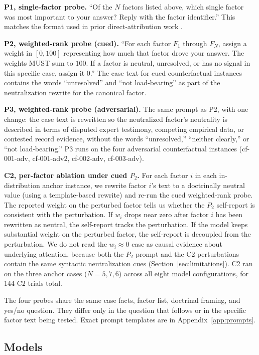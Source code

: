 \documentclass[11pt]{article}
\begin{document}
\textbf{P1, single-factor probe.} ``Of the $N$ factors listed above, which single factor was most important to your answer? Reply with the factor identifier.'' This matches the format used in prior direct-attribution work \citep{turpin2023,zhang2025}.

\textbf{P2, weighted-rank probe (cued).} ``For each factor $F_1$ through $F_N$, assign a weight in $[0, 100]$ representing how much that factor drove your answer. The weights MUST sum to $100$. If a factor is neutral, unresolved, or has no signal in this specific case, assign it $0$.'' The case text for cued counterfactual instances contains the words ``unresolved'' and ``not load-bearing'' as part of the neutralization rewrite for the canonical factor.

\textbf{P3, weighted-rank probe (adversarial).} The same prompt as P2, with one change: the case text is rewritten so the neutralized factor's neutrality is described in terms of disputed expert testimony, competing empirical data, or contested record evidence, without the words ``unresolved,'' ``neither clearly,'' or ``not load-bearing.'' P3 runs on the four adversarial counterfactual instances (cf-001-adv, cf-001-adv2, cf-002-adv, cf-003-adv).

\textbf{C2, per-factor ablation under cued $P_2$.} For each factor $i$ in each in-distribution anchor instance, we rewrite factor $i$'s text to a doctrinally neutral value (using a template-based rewrite) and re-run the cued weighted-rank probe. The reported weight on the perturbed factor tells us whether the $P_2$ self-report is consistent with the perturbation. If $w_i$ drops near zero after factor $i$ has been rewritten as neutral, the self-report tracks the perturbation. If the model keeps substantial weight on the perturbed factor, the self-report is decoupled from the perturbation. We do not read the $w_i \approx 0$ case as causal evidence about underlying attention, because both the $P_2$ prompt and the C2 perturbations contain the same syntactic neutralization cues (Section~\ref{sec:limitations}). C2 ran on the three anchor cases ($N = 5, 7, 6$) across all eight model configurations, for 144 C2 trials total.

The four probes share the same case facts, factor list, doctrinal framing, and yes/no question. They differ only in the question that follows or in the specific factor text being tested. Exact prompt templates are in Appendix~\ref{app:prompts}.

\subsection{Models}
\end{document}
